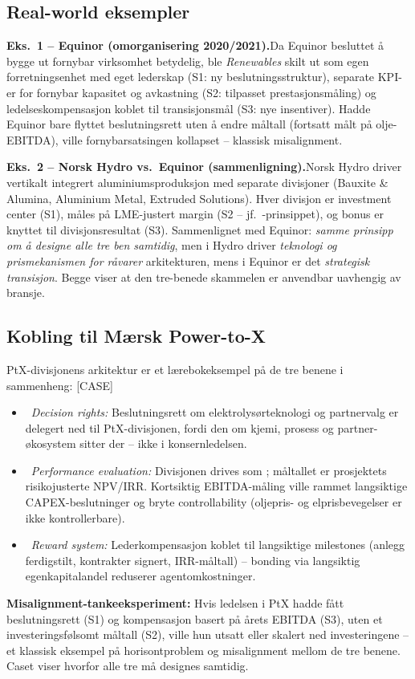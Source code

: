 \subsection*{Real-world eksempler}

\textbf{Eks.~1 -- Equinor (omorganisering 2020/2021).}\quad [EKS]
Da Equinor besluttet å bygge ut fornybar virksomhet betydelig, ble \emph{Renewables} skilt ut som egen forretningsenhet med eget lederskap (S1: ny beslutningsstruktur), separate KPI-er for fornybar kapasitet og avkastning (S2: tilpasset prestasjonsmåling) og ledelseskompensasjon koblet til transisjonsmål (S3: nye insentiver). Hadde Equinor bare flyttet beslutningsrett uten å endre måltall (fortsatt målt på olje-EBITDA), ville fornybarsatsingen kollapset -- klassisk misalignment.

\textbf{Eks.~2 -- Norsk Hydro vs.\ Equinor (sammenligning).}\quad [EKS]
Norsk Hydro driver vertikalt integrert aluminiumsproduksjon med separate divisjoner (Bauxite \& Alumina, Aluminium Metal, Extruded Solutions). Hver divisjon er investment center (S1), måles på LME-justert margin (S2 -- jf.\ -prinsippet), og bonus er knyttet til divisjonsresultat (S3). Sammenlignet med Equinor: \emph{samme prinsipp om å designe alle tre ben samtidig}, men i Hydro driver \emph{teknologi og prismekanismen for råvarer} arkitekturen, mens i Equinor er det \emph{strategisk transisjon}. Begge viser at den tre-benede skammelen er anvendbar uavhengig av bransje.

\subsection*{Kobling til Mærsk Power-to-X}
PtX-divisjonens arkitektur er et lærebokeksempel på de tre benene i sammenheng: [CASE]
\begin{itemize}\setlength{\itemsep}{2pt}
\item \SOne\ \emph{Decision rights:} Beslutningsrett om elektrolysørteknologi og partnervalg er delegert ned til PtX-divisjonen, fordi den  om kjemi, prosess og partner-økosystem sitter der -- ikke i konsernledelsen.
\item \STwo\ \emph{Performance evaluation:} Divisjonen drives som ; måltallet er prosjektets risikojusterte NPV/IRR. Kortsiktig EBITDA-måling ville rammet langsiktige CAPEX-beslutninger og bryte controllability (oljepris- og elprisbevegelser er ikke kontrollerbare).
\item \SThree\ \emph{Reward system:} Lederkompensasjon koblet til langsiktige milestones (anlegg ferdigstilt, kontrakter signert, IRR-måltall) -- bonding via langsiktig egenkapitalandel reduserer agentomkostninger.
\end{itemize}
\textbf{Misalignment-tankeeksperiment:} Hvis ledelsen i PtX hadde fått beslutningsrett (S1) og kompensasjon basert på årets EBITDA (S3), uten et investeringsfølsomt måltall (S2), ville hun utsatt eller skalert ned investeringene -- et klassisk eksempel på horisontproblem og misalignment mellom de tre benene. Caset viser hvorfor alle tre må designes samtidig.

